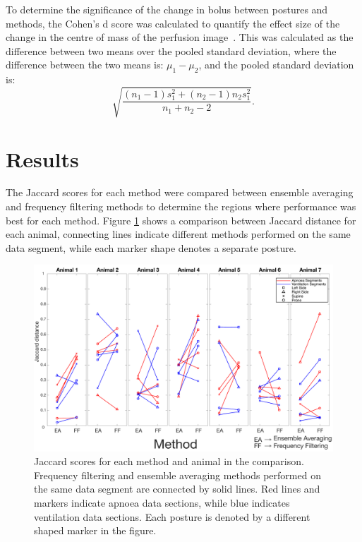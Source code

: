To determine the significance of the change in bolus between postures
and methods, the Cohen's d score was calculated to quantify the effect size of
the change in the centre of mass of the perfusion image~\parencite{cohen_statistical_1977}.  
This was calculated as the difference between two means over the pooled standard deviation,
where the difference between the two means is: $\mu_1-\mu_2$, and the pooled
standard deviation is: 
\begin{equation}
{\sqrt{\frac{(n_1-1)s^2_1+(n_2-1)n_2s^2_1}{n_1+n_2-2}}}. 
\end{equation}

\section{Results}                         %

The Jaccard scores for each method were compared between 
ensemble averaging and frequency filtering methods to determine the regions where performance 
was best for each method. Figure \ref{fig:resultsJaccard} shows a 
comparison between Jaccard distance for each animal, connecting lines 
indicate different methods performed on the same data segment, while each marker shape
denotes a separate posture.

\begin{figure}[H]
\centering
\includegraphics[width=\textwidth]{chapter3-perfusion_analysis/imgs/fig-resultsJaccard.pdf}
\caption[Jaccard index scores]{\label{fig:resultsJaccard}%
Jaccard scores for each method and animal in the comparison. Frequency 
filtering and ensemble averaging methods performed on the same data segment are 
connected by solid lines. Red lines and markers indicate apnoea data sections, 
while blue indicates ventilation data sections. Each posture is denoted by a different
shaped marker in the figure.
}
\end{figure}

